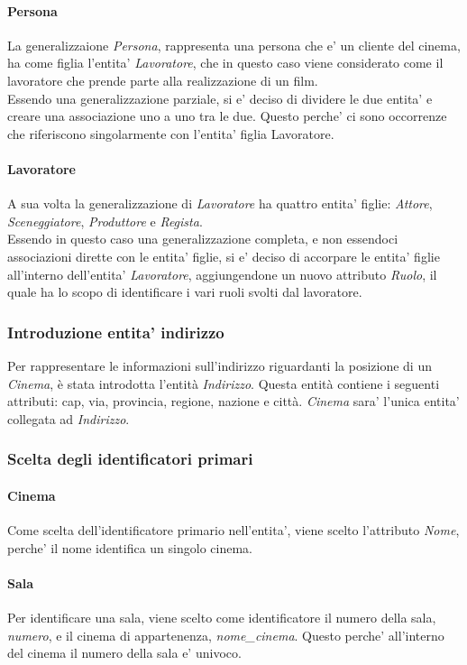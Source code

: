 \documentclass[10pt]{article}
\begin{document}
	\paragraph{Persona}
	La generalizzaione \textit{Persona}, rappresenta una persona che e' un cliente del cinema, ha come figlia l'entita' \textit{Lavoratore}, che in questo caso viene considerato come il lavoratore che prende parte alla realizzazione di un film.\\
	Essendo una generalizzazione parziale, si e' deciso di dividere le due entita' e creare una associazione uno a uno tra le due. Questo perche' ci sono occorrenze che riferiscono singolarmente con l'entita' figlia Lavoratore.\\
	\paragraph{Lavoratore}
	A sua volta la generalizzazione di \textit{Lavoratore} ha quattro entita' figlie: \textit{Attore}, \textit{Sceneggiatore}, \textit{Produttore} e \textit{Regista}.\\
	Essendo in questo caso una generalizzazione completa, e non essendoci associazioni dirette con le entita' figlie, si e' deciso di accorpare le entita' figlie all'interno dell'entita' \textit{Lavoratore}, aggiungendone un nuovo attributo \textit{Ruolo}, il quale ha lo scopo di identificare i vari ruoli svolti dal lavoratore.
	\subsubsection{Introduzione entita' indirizzo}
	Per rappresentare le informazioni sull’indirizzo riguardanti la posizione di un \textit{Cinema}, è stata introdotta l’entità \textit{Indirizzo}. Questa entità contiene i seguenti attributi: cap, via, provincia, regione, nazione e città. \textit{Cinema} sara' l'unica entita' collegata ad \textit{Indirizzo}.
	\subsubsection{Scelta degli identificatori primari}
	\paragraph{Cinema}
	Come scelta dell'identificatore primario nell'entita', viene scelto l'attributo \textit{Nome}, perche' il nome identifica un singolo cinema.
	\paragraph{Sala}
	Per identificare una sala, viene scelto come identificatore il numero della sala, \textit{numero}, e il cinema di appartenenza, \textit{nome\_cinema}. Questo perche' all'interno del cinema il numero della sala e' univoco.
\end{document}

